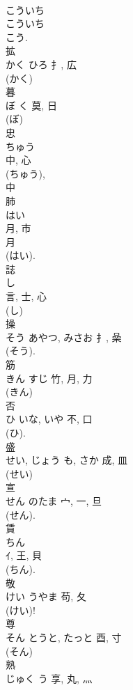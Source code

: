 \documentclass[8pt]{extreport}
\begin{document}
\begin{CJK}{UTF8}{min}
\\	こういち 
\\	こういち 
\\	こう.	
\\	拡	
\\	かく	ひろ	扌, 広	
\\	(かく) 
\\	暮	
\\	ぼ	く	莫, 日	
\\	(ぼ) 
\\	忠	
\\	ちゅう	
\\	中, 心	
\\	(ちゅう), 
\\	中 
\\	肺	
\\	はい	
\\	月, 市	
\\	月 
\\	(はい). 
\\	誌	
\\	し	
\\	言, 士, 心	
\\	(し) 
\\	操	
\\	そう	あやつ, みさお	扌, 喿	
\\	(そう). 
\\	筋	
\\	きん	すじ	竹, 月, 力	
\\	(きん) 
\\	否	
\\	ひ	いな, いや	不, 口	
\\	(ひ). 
\\	盛	
\\	せい, じょう	も, さか	成, 皿	
\\	(せい) 
\\	宣	
\\	せん	のたま	宀, 一, 旦	
\\	(せん). 
\\	賃	
\\	ちん	
\\	ｲ, 王, 貝	
\\	(ちん).	
\\	敬	
\\	けい	うやま	苟, 夂	
\\	(けい)!	
\\	尊	
\\	そん	とうと, たっと	酉, 寸		
\\	(そん) 
\\	熟	
\\	じゅく	う	享, 丸, 灬	

\end{CJK}
\end{document}
